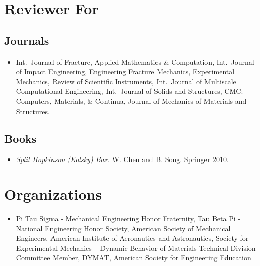 \section*{Reviewer For}

\subsection*{Journals}

\begin{itemize}
    \item Int.~Journal of Fracture, Applied Mathematics \& Computation, Int.~Journal of Impact Engineering, Engineering Fracture Mechanics, Experimental Mechanics,  Review of Scientific Instruments, Int.~Journal of Multiscale Computational Engineering, Int.~Journal of Solids and Structures, CMC: Computers, Materials, \& Continua, Journal of Mechanics of Materials and Structures.
\end{itemize}

\subsection*{Books}

\begin{itemize}
    \item {\it Split Hopkinson (Kolsky) Bar.}  W. Chen and B. Song.  Springer 2010.
\end{itemize}

\section*{Organizations}

\begin{itemize}
    \item Pi Tau Sigma - Mechanical Engineering Honor Fraternity, Tau Beta Pi - National Engineering Honor Society, American Society of Mechanical Engineers, American Institute of Aeronautics and Astronautics, Society for Experimental Mechanics -- Dynamic Behavior of Materials Technical Division Committee Member, DYMAT, American Society for Engineering Education
\end{itemize}

